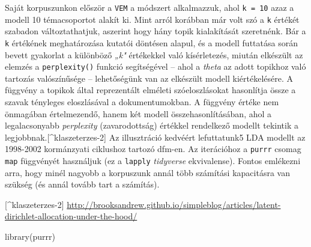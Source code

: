 \documentclass[
]{book}
\newenvironment{Shaded}{\begin{snugshade}}{\end{snugshade}}
\newcommand{\FunctionTok}[1]{\textcolor[rgb]{0.00,0.00,0.00}{#1}}
\newcommand{\NormalTok}[1]{#1}
\begin{document}
Saját korpuszunkon először a \texttt{VEM} a módszert alkalmazzuk, ahol
\texttt{k\ =\ 10} azaz a modell 10 témacsoportot alakít ki. Mint arról
korábban már volt szó a \texttt{k} értékét szabadon változtathatjuk,
aszerint hogy hány topik kialakítását szeretnénk. Bár a \texttt{k}
értékének meghatározása kutatói döntésen alapul, és a modell futtatása
során bevett gyakorlat a különböző \emph{„k"} értékekkel való
kísérletezés, miután elkészült az elemzés a \texttt{perplexity()}
funkció segítségével -- ahol a \emph{theta} az adott topikhoz való
tartozás valószínűsége -- lehetőségünk van az elkészült modell
kiértékelésére. A függvény a topikok által reprezentált elméleti
szóeloszlásokat hasonlítja össze a szavak tényleges eloszlásával a
dokumentumokban. A függvény értéke nem önmagában értelmezendő, hanem két
modell összehasonlításában, ahol a legalacsonyabb \emph{perplexity}
(zavarodottság) értékkel rendelkező modellt tekintik a
legjobbnak.{[}\^{}klaszeterzes-2{]} Az illusztráció kedvéért
lefuttatunk5 LDA modellt az 1998-2002 kormánzyati ciklushoz tartozó
dfm-en. Az iterációhoz a \texttt{purrr} csomag \texttt{map} függvényét
használjuk (ez a \texttt{lapply} \emph{tidyverse} ekvivalense). Fontos
emlékezni arra, hogy minél nagyobb a korpuszunk annál több számítási
kapacitásra van szükség (és annál tovább tart a számítás).

{[}\^{}klaszeterzes-2{]}
\url{http://brooksandrew.github.io/simpleblog/articles/latent-dirichlet-allocation-under-the-hood/}

\begin{Shaded}
\begin{Highlighting}[]
\FunctionTok{library}\NormalTok{(purrr)}
\end{Highlighting}
\end{Shaded}
\end{document}
